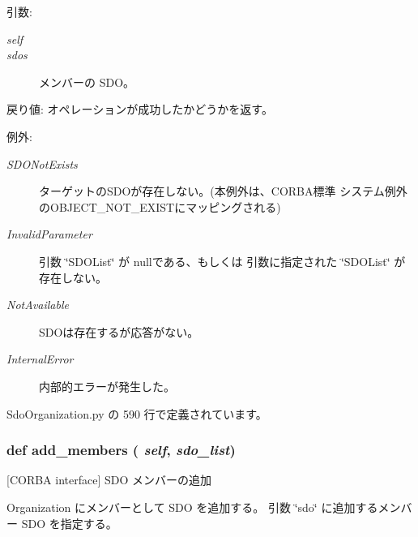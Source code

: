 \begin{Desc}
\item[引数:]
\begin{description}
\item[{\em self}]\item[{\em sdos}]メンバーの SDO。\end{description}
\end{Desc}
\begin{Desc}
\item[戻り値:]オペレーションが成功したかどうかを返す。\end{Desc}
\begin{Desc}
\item[例外:]
\begin{description}
\item[{\em SDONotExists}]ターゲットのSDOが存在しない。(本例外は、CORBA標準 システム例外のOBJECT\_\-NOT\_\-EXISTにマッピングされる) \item[{\em InvalidParameter}]引数 \char`\"{}SDOList\char`\"{} が nullである、もしくは 引数に指定された \char`\"{}SDOList\char`\"{} が存在しない。 \item[{\em NotAvailable}]SDOは存在するが応答がない。 \item[{\em InternalError}]内部的エラーが発生した。 \end{description}
\end{Desc}


 SdoOrganization.py の 590 行で定義されています。
\subsubsection{\setlength{\rightskip}{0pt plus 5cm}def add\_\-members ( {\em self},  {\em sdo\_\-list})}\label{classsource__py_1_1_sdo_organization_1_1_organization__impl_68084a2fa26686388a3bd6156485329f}


[CORBA interface] SDO メンバーの追加 

Organization にメンバーとして SDO を追加する。 引数 \char`\"{}sdo\char`\"{} に追加するメンバー SDO を指定する。

